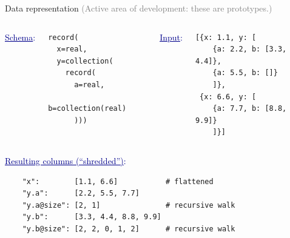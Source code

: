 \documentclass{beamer}
\begin{document}
\begin{frame}[fragile]{Data representation}
\vspace{0.5 cm}
\textcolor{gray}{(Active area of development: these are prototypes.)}
\small

\vspace{0.5 cm}
\begin{columns}
\textcolor{darkblue}{\normalsize \underline{Schema}:}
\vspace{-0.1 cm}
\begin{verbatim}
record(
  x=real,
  y=collection(
    record(
      a=real,
      b=collection(real)
      )))
\end{verbatim}

\textcolor{darkblue}{\normalsize \underline{Input}:}
\vspace{-0.1 cm}
\begin{verbatim}
[{x: 1.1, y: [
    {a: 2.2, b: [3.3, 4.4]},
    {a: 5.5, b: []}
    ]},
 {x: 6.6, y: [
    {a: 7.7, b: [8.8, 9.9]}
    ]}]
\end{verbatim}
\end{columns}

\vspace{0.5 cm}
\textcolor{darkblue}{\normalsize \underline{Resulting columns (``shredded'')}:}
\vspace{-0.1 cm}
\begin{verbatim}
    "x":        [1.1, 6.6]           # flattened
    "y.a":      [2.2, 5.5, 7.7]
    "y.a@size": [2, 1]               # recursive walk
    "y.b":      [3.3, 4.4, 8.8, 9.9]
    "y.b@size": [2, 2, 0, 1, 2]      # recursive walk
\end{verbatim}
\end{frame}
\end{document}
